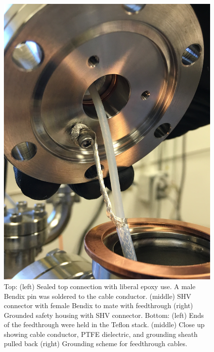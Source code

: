 \begin{figure}[htbp]
\begin{minipage}{0.32\textwidth}
    \includegraphics[width=\linewidth, angle=270]{figures/testbed/ft6_3.jpg}
    \end{minipage}
    
    
\caption{Top: (left) Sealed top connection with liberal epoxy use. A male Bendix pin was soldered to the cable conductor. (middle) SHV connector with female Bendix to mate with feedthrough (right) Grounded safety housing with SHV connector. Bottom: (left) Ends of the feedthrough were held in the Teflon stack. (middle) Close up showing cable conductor, PTFE dielectric, and grounding sheath pulled back (right) Grounding scheme for feedthrough cables.}
 \label{fig:cableft}
\end{figure}




